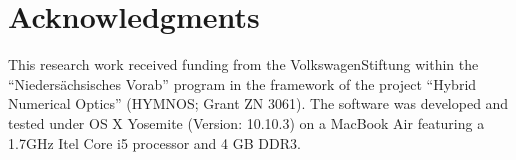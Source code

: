\documentclass[review]{elsarticle}
\begin{document}

\section*{Acknowledgments}
This research work received funding from the VolkswagenStiftung within the
``Nieders\"achsisches Vorab'' program in the framework of the project ``Hybrid
Numerical Optics''  (HYMNOS; Grant ZN 3061). The software was developed and 
tested under OS X Yosemite (Version: 10.10.3) on a MacBook Air featuring a
1.7GHz Itel Core i5 processor and 4 GB DDR3.


\end{document}
